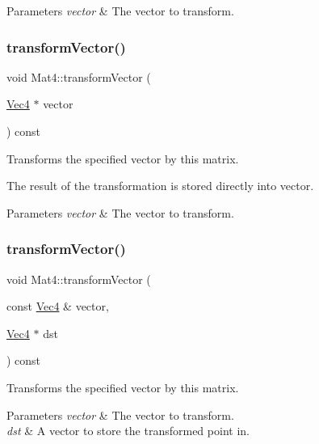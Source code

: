 \begin{DoxyParams}{Parameters}
{\em vector} & The vector to transform. \\
\hline
\end{DoxyParams}
\mbox{\label{classMat4_a2c78f362e212324aa1ec085aefc07b78}} 
\subsubsection{\texorpdfstring{transform\+Vector()}{transformVector()}\hspace{0.1cm}{\footnotesize\ttfamily [8/10]}}
{\footnotesize\ttfamily void Mat4\+::transform\+Vector (\begin{DoxyParamCaption}\item[{\hyperlink{classVec4}{Vec4} $\ast$}]{vector }\end{DoxyParamCaption}) const}

Transforms the specified vector by this matrix.

The result of the transformation is stored directly into vector.


\begin{DoxyParams}{Parameters}
{\em vector} & The vector to transform. \\
\hline
\end{DoxyParams}
\mbox{\label{classMat4_ac710d11704a735e831671574b5e1d7aa}} 
\subsubsection{\texorpdfstring{transform\+Vector()}{transformVector()}\hspace{0.1cm}{\footnotesize\ttfamily [9/10]}}
{\footnotesize\ttfamily void Mat4\+::transform\+Vector (\begin{DoxyParamCaption}\item[{const \hyperlink{classVec4}{Vec4} \&}]{vector,  }\item[{\hyperlink{classVec4}{Vec4} $\ast$}]{dst }\end{DoxyParamCaption}) const}

Transforms the specified vector by this matrix.


\begin{DoxyParams}{Parameters}
{\em vector} & The vector to transform. \\
\hline
{\em dst} & A vector to store the transformed point in. \\
\hline
\end{DoxyParams}
\mbox{\label{classMat4_ac710d11704a735e831671574b5e1d7aa}} 
